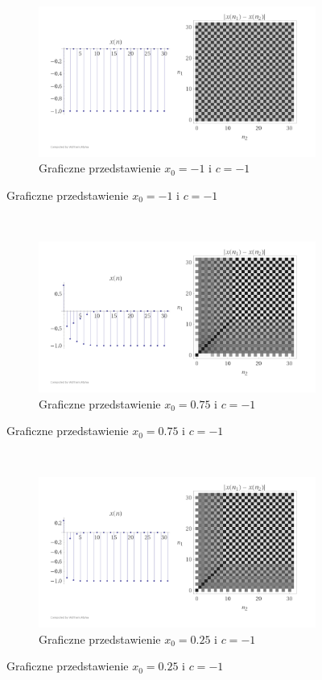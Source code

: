 \documentclass{article}
\begin{document}
\begin{figure}[ht]
	\centering
	\begin{subfigure}{1\textwidth}
		\centering
		\includegraphics[width=.8\linewidth]{WolfPlots/-1--1}  
		\caption*{Graficzne przedstawienie $x_{0}=-1$ i $c = -1$ }
		
	\end{subfigure}
\end{figure}\\
\begin{figure}[ht]
	\centering
	\begin{subfigure}{1\textwidth}
		\centering
		\includegraphics[width=.8\linewidth]{WolfPlots/-1-075}  
		\caption*{Graficzne przedstawienie $x_{0}=0.75$ i $c = -1$ }
		
	\end{subfigure}
\end{figure}\\
\clearpage
\begin{figure}[ht]
	\centering
	\begin{subfigure}{1\textwidth}
		\centering
		\includegraphics[width=.8\linewidth]{WolfPlots/-1-025}  
		\caption*{Graficzne przedstawienie $x_{0}=0.25$ i $c = -1$ }
		
	\end{subfigure}
\end{figure}
\end{document}
